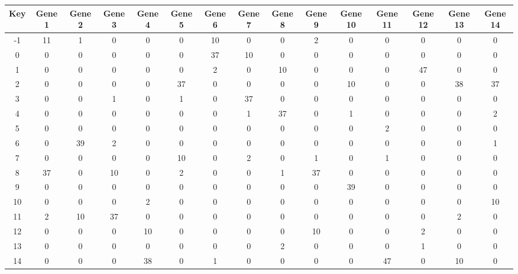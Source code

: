 \begin{tabular}{|c|c|c|c|c|c|c|c|c|c|c|c|c|c|c|}
\hline
Key & Gene 1 & Gene 2 & Gene 3 & Gene 4 & Gene 5 & Gene 6 & Gene 7 & Gene 8 & Gene 9 & Gene 10 & Gene 11 & Gene 12 & Gene 13 & Gene 14 \\
\hline
-1 & 11 & 1 & 0 & 0 & 0 & 10 & 0 & 0 & 2 & 0 & 0 & 0 & 0 & 0 \\
0 & 0 & 0 & 0 & 0 & 0 & 37 & 10 & 0 & 0 & 0 & 0 & 0 & 0 & 0 \\
1 & 0 & 0 & 0 & 0 & 0 & 2 & 0 & 10 & 0 & 0 & 0 & 47 & 0 & 0 \\
2 & 0 & 0 & 0 & 0 & 37 & 0 & 0 & 0 & 0 & 10 & 0 & 0 & 38 & 37 \\
3 & 0 & 0 & 1 & 0 & 1 & 0 & 37 & 0 & 0 & 0 & 0 & 0 & 0 & 0 \\
4 & 0 & 0 & 0 & 0 & 0 & 0 & 1 & 37 & 0 & 1 & 0 & 0 & 0 & 2 \\
5 & 0 & 0 & 0 & 0 & 0 & 0 & 0 & 0 & 0 & 0 & 2 & 0 & 0 & 0 \\
6 & 0 & 39 & 2 & 0 & 0 & 0 & 0 & 0 & 0 & 0 & 0 & 0 & 0 & 1 \\
7 & 0 & 0 & 0 & 0 & 10 & 0 & 2 & 0 & 1 & 0 & 1 & 0 & 0 & 0 \\
8 & 37 & 0 & 10 & 0 & 2 & 0 & 0 & 1 & 37 & 0 & 0 & 0 & 0 & 0 \\
9 & 0 & 0 & 0 & 0 & 0 & 0 & 0 & 0 & 0 & 39 & 0 & 0 & 0 & 0 \\
10 & 0 & 0 & 0 & 2 & 0 & 0 & 0 & 0 & 0 & 0 & 0 & 0 & 0 & 10 \\
11 & 2 & 10 & 37 & 0 & 0 & 0 & 0 & 0 & 0 & 0 & 0 & 0 & 2 & 0 \\
12 & 0 & 0 & 0 & 10 & 0 & 0 & 0 & 0 & 10 & 0 & 0 & 2 & 0 & 0 \\
13 & 0 & 0 & 0 & 0 & 0 & 0 & 0 & 2 & 0 & 0 & 0 & 1 & 0 & 0 \\
14 & 0 & 0 & 0 & 38 & 0 & 1 & 0 & 0 & 0 & 0 & 47 & 0 & 10 & 0 \\
\hline
\end{tabular}